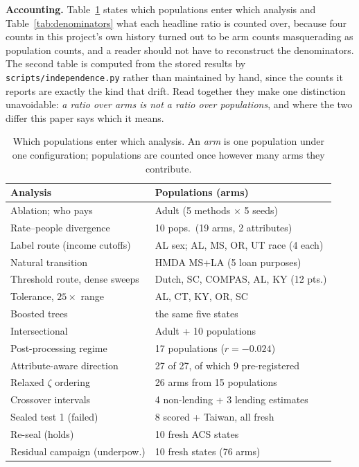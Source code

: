 \documentclass[conference]{IEEEtran}
\begin{document}
\textbf{Accounting.} Table~\ref{tab:accounting} states which populations enter which
analysis and Table~\ref{tab:denominators} what each headline ratio is counted over, because
four counts in this project's own history turned out to be arm counts masquerading as
population counts, and a reader should not have to reconstruct the denominators. The second
table is computed from the stored results by \texttt{scripts/independence.py} rather than
maintained by hand, since the counts it reports are exactly the kind that drift. Read
together they make one distinction unavoidable: \emph{a ratio over arms is not a ratio over
populations}, and where the two differ this paper says which it means.

\begin{table}[t]
\caption{Which populations enter which analysis. An \emph{arm} is one population under one
configuration; populations are counted once however many arms they contribute.}
\label{tab:accounting}
\centering
\footnotesize
\setlength{\tabcolsep}{3pt}
\begin{tabular}{@{}ll@{}}
\toprule
\textbf{Analysis} & \textbf{Populations (arms)} \\
\midrule
Ablation; who pays & Adult (5 methods $\times$ 5 seeds) \\
Rate--people divergence & 10 pops.\ (19 arms, 2 attributes) \\
Label route (income cutoffs) & AL sex; AL, MS, OR, UT race (4 each) \\
Natural transition & HMDA MS+LA (5 loan purposes) \\
Threshold route, dense sweeps & Dutch, SC, COMPAS, AL, KY (12 pts.) \\
Tolerance, $25\times$ range & AL, CT, KY, OR, SC \\
Boosted trees & the same five states \\
Intersectional & Adult + 10 populations \\
Post-processing regime & 17 populations ($r=-0.024$) \\
Attribute-aware direction & 27 of 27, of which 9 pre-registered \\
Relaxed $\zeta$ ordering & 26 arms from 15 populations \\
Crossover intervals & 4 non-lending + 3 lending estimates \\
Sealed test 1 (failed) & 8 scored + Taiwan, all fresh \\
Re-seal (holds) & 10 fresh ACS states \\
Residual campaign (underpow.) & 10 fresh states (76 arms) \\

\end{tabular}
\end{table}
\end{document}
